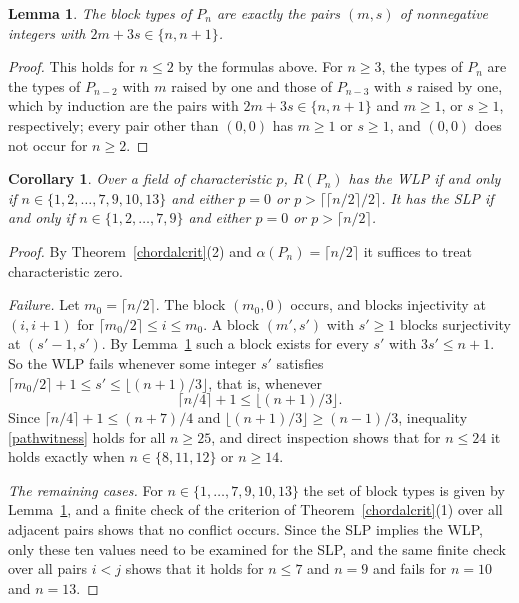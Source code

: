 \documentclass[11pt,a4paper]{article}
\newtheorem{lemma}[theorem]{Lemma}
\newtheorem{corollary}[theorem]{Corollary}
\theoremstyle{definition}
\begin{document}
\begin{lemma}\label{pathtypes}
The block types of $P_n$ are exactly the pairs $(m,s)$ of nonnegative integers with $2m+3s\in\{n,n+1\}$.
\end{lemma}
\begin{proof}
This holds for $n\le2$ by the formulas above. For $n\ge3$, the types of $P_n$ are the types of $P_{n-2}$ with $m$ raised by one and those of $P_{n-3}$ with $s$ raised by one, which by induction are the pairs with $2m+3s\in\{n,n+1\}$ and $m\ge1$, or $s\ge1$, respectively; every pair other than $(0,0)$ has $m\ge1$ or $s\ge1$, and $(0,0)$ does not occur for $n\ge2$.
\end{proof}

\begin{corollary}\label{paths}
Over a field of characteristic $p$, $R(P_n)$ has the WLP if and only if $n\in\{1,2,\dots,7,9,10,13\}$ and either $p=0$ or $p>\lceil\lceil n/2\rceil/2\rceil$. It has the SLP if and only if $n\in\{1,2,\dots,7,9\}$ and either $p=0$ or $p>\lceil n/2\rceil$.
\end{corollary}
\begin{proof}
By Theorem~\ref{chordalcrit}(2) and $\alpha(P_n)=\lceil n/2\rceil$ it suffices to treat characteristic zero.

\emph{Failure.} Let $m_0=\lceil n/2\rceil$. The block $(m_0,0)$ occurs, and blocks injectivity at $(i,i+1)$ for $\lceil m_0/2\rceil\le i\le m_0$. A block $(m',s')$ with $s'\ge1$ blocks surjectivity at $(s'-1,s')$. By Lemma~\ref{pathtypes} such a block exists for every $s'$ with $3s'\le n+1$. So the WLP fails whenever some integer $s'$ satisfies $\lceil m_0/2\rceil+1\le s'\le\lfloor(n+1)/3\rfloor$, that is, whenever
\begin{equation}\label{pathwitness}
 \lceil n/4\rceil+1\le\lfloor(n+1)/3\rfloor .
\end{equation}
Since $\lceil n/4\rceil+1\le(n+7)/4$ and $\lfloor(n+1)/3\rfloor\ge(n-1)/3$, inequality \eqref{pathwitness} holds for all $n\ge25$, and direct inspection shows that for $n\le24$ it holds exactly when $n\in\{8,11,12\}$ or $n\ge14$.

\emph{The remaining cases.} For $n\in\{1,\dots,7,9,10,13\}$ the set of block types is given by Lemma~\ref{pathtypes}, and a finite check of the criterion of Theorem~\ref{chordalcrit}(1) over all adjacent pairs shows that no conflict occurs. Since the SLP implies the WLP, only these ten values need to be examined for the SLP, and the same finite check over all pairs $i<j$ shows that it holds for $n\le7$ and $n=9$ and fails for $n=10$ and $n=13$.
\end{proof}
\end{document}
